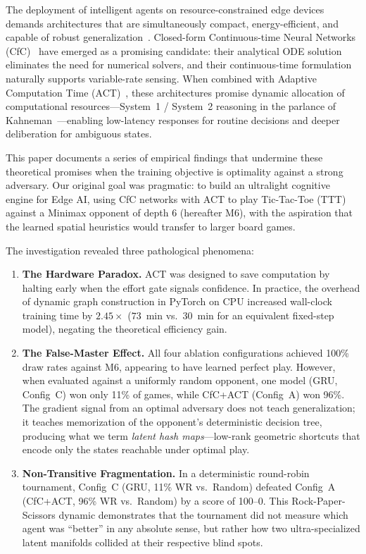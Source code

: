 \documentclass[conference]{IEEEtran}
\begin{document}
The deployment of intelligent agents on resource-constrained edge devices demands architectures that are simultaneously compact, energy-efficient, and capable of robust generalization~\cite{chen2023deep}. Closed-form Continuous-time Neural Networks (CfC)~\cite{hasani2021closed} have emerged as a promising candidate: their analytical ODE solution eliminates the need for numerical solvers, and their continuous-time formulation naturally supports variable-rate sensing. When combined with Adaptive Computation Time (ACT)~\cite{graves2016adaptive}, these architectures promise dynamic allocation of computational resources---System~1 / System~2 reasoning in the parlance of Kahneman~\cite{kahneman2011thinking}---enabling low-latency responses for routine decisions and deeper deliberation for ambiguous states.

This paper documents a series of empirical findings that undermine these theoretical promises when the training objective is optimality against a strong adversary. Our original goal was pragmatic: to build an ultralight cognitive engine for Edge AI, using CfC networks with ACT to play Tic-Tac-Toe (TTT) against a Minimax opponent of depth 6 (hereafter M6), with the aspiration that the learned spatial heuristics would transfer to larger board games.

The investigation revealed three pathological phenomena:

\begin{enumerate}
    \item \textbf{The Hardware Paradox.} ACT was designed to save computation by halting early when the effort gate signals confidence. In practice, the overhead of dynamic graph construction in PyTorch on CPU increased wall-clock training time by $2.45\times$ ($73$~min vs.\ $30$~min for an equivalent fixed-step model), negating the theoretical efficiency gain.

    \item \textbf{The False-Master Effect.} All four ablation configurations achieved 100\% draw rates against M6, appearing to have learned perfect play. However, when evaluated against a uniformly random opponent, one model (GRU, Config~C) won only 11\% of games, while CfC+ACT (Config~A) won 96\%. The gradient signal from an optimal adversary does not teach generalization; it teaches memorization of the opponent's deterministic decision tree, producing what we term \emph{latent hash maps}---low-rank geometric shortcuts that encode only the states reachable under optimal play.

    \item \textbf{Non-Transitive Fragmentation.} In a deterministic round-robin tournament, Config~C (GRU, 11\% WR vs.\ Random) defeated Config~A (CfC+ACT, 96\% WR vs.\ Random) by a score of 100--0. This Rock-Paper-Scissors dynamic demonstrates that the tournament did not measure which agent was ``better'' in any absolute sense, but rather how two ultra-specialized latent manifolds collided at their respective blind spots.
\end{enumerate}
\end{document}
